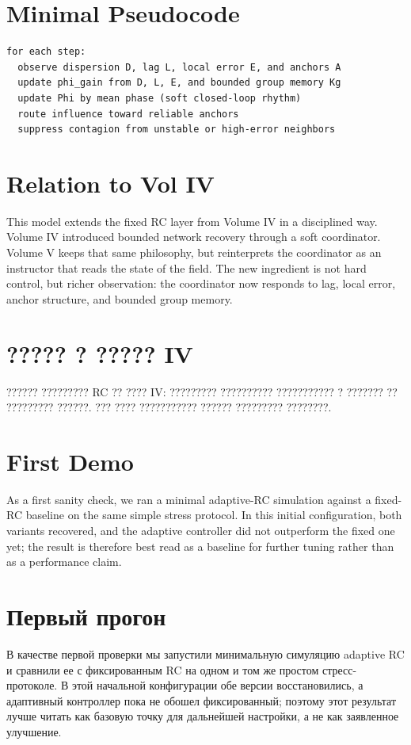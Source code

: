 ﻿\documentclass[12pt,a4paper]{article}
\begin{document}
\section{Minimal Pseudocode}
\begin{verbatim}
for each step:
  observe dispersion D, lag L, local error E, and anchors A
  update phi_gain from D, L, E, and bounded group memory Kg
  update Phi by mean phase (soft closed-loop rhythm)
  route influence toward reliable anchors
  suppress contagion from unstable or high-error neighbors
\end{verbatim}

\section{Relation to Vol IV}
This model extends the fixed RC layer from Volume IV in a disciplined way. Volume IV introduced bounded network recovery through a soft coordinator. Volume V keeps that same philosophy, but reinterprets the coordinator as an instructor that reads the state of the field. The new ingredient is not hard control, but richer observation: the coordinator now responds to lag, local error, anchor structure, and bounded group memory.

\section{????? ? ????? IV}
?????? ????????? RC ?? ???? IV: ????????? ?????????? ??????????? ? ??????? ?? ????????? ??????. ??? ???? ??????????? ?????? ????????? ????????.







\section{First Demo}
As a first sanity check, we ran a minimal adaptive-RC simulation against a fixed-RC baseline on the same simple stress protocol. In this initial configuration, both variants recovered, and the adaptive controller did not outperform the fixed one yet; the result is therefore best read as a baseline for further tuning rather than as a performance claim.

\section{Первый прогон}
В качестве первой проверки мы запустили минимальную симуляцию adaptive RC и сравнили ее с фиксированным RC на одном и том же простом стресс-протоколе. В этой начальной конфигурации обе версии восстановились, а адаптивный контроллер пока не обошел фиксированный; поэтому этот результат лучше читать как базовую точку для дальнейшей настройки, а не как заявленное улучшение.
\end{document}
